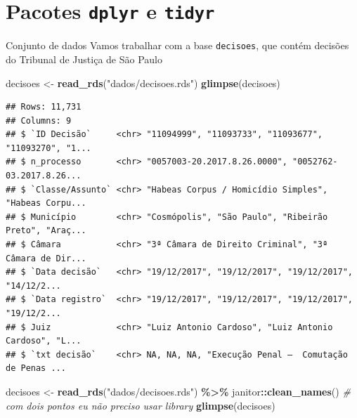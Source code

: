 \documentclass[
  10pt,
  ignorenonframetext,
]{beamer}
\newenvironment{Shaded}{\begin{snugshade}}{\end{snugshade}}
\newcommand{\CommentTok}[1]{\textcolor[rgb]{0.56,0.35,0.01}{\textit{#1}}}
\newcommand{\KeywordTok}[1]{\textcolor[rgb]{0.13,0.29,0.53}{\textbf{#1}}}
\newcommand{\NormalTok}[1]{#1}
\newcommand{\OperatorTok}[1]{\textcolor[rgb]{0.81,0.36,0.00}{\textbf{#1}}}
\newcommand{\StringTok}[1]{\textcolor[rgb]{0.31,0.60,0.02}{#1}}
\begin{document}
\hypertarget{pacotes-dplyr-e-tidyr}{%
\section{\texorpdfstring{Pacotes \texttt{dplyr} e
\texttt{tidyr}}{Pacotes dplyr e tidyr}}\label{pacotes-dplyr-e-tidyr}}

\begin{frame}[fragile]{Conjunto de dados}
\protect\hypertarget{conjunto-de-dados}{}
Vamos trabalhar com a base \texttt{decisoes}, que contém decisões do
Tribunal de Justiça de São Paulo

\begin{Shaded}
\begin{Highlighting}[]
\NormalTok{decisoes \textless{}{-}}\StringTok{ }\KeywordTok{read\_rds}\NormalTok{(}\StringTok{"dados/decisoes.rds"}\NormalTok{)}
\KeywordTok{glimpse}\NormalTok{(decisoes)}
\end{Highlighting}
\end{Shaded}

\begin{verbatim}
## Rows: 11,731
## Columns: 9
## $ `ID Decisão`     <chr> "11094999", "11093733", "11093677", "11093270", "1...
## $ n_processo       <chr> "0057003-20.2017.8.26.0000", "0052762-03.2017.8.26...
## $ `Classe/Assunto` <chr> "Habeas Corpus / Homicídio Simples", "Habeas Corpu...
## $ Município        <chr> "Cosmópolis", "São Paulo", "Ribeirão Preto", "Araç...
## $ Câmara           <chr> "3ª Câmara de Direito Criminal", "3ª Câmara de Dir...
## $ `Data decisão`   <chr> "19/12/2017", "19/12/2017", "19/12/2017", "14/12/2...
## $ `Data registro`  <chr> "19/12/2017", "19/12/2017", "19/12/2017", "19/12/2...
## $ Juiz             <chr> "Luiz Antonio Cardoso", "Luiz Antonio Cardoso", "L...
## $ `txt decisão`    <chr> NA, NA, NA, "Execução Penal –  Comutação de Penas ...
\end{verbatim}

\begin{Shaded}
\begin{Highlighting}[]
\NormalTok{decisoes \textless{}{-}}\StringTok{ }\KeywordTok{read\_rds}\NormalTok{(}\StringTok{"dados/decisoes.rds"}\NormalTok{) }\OperatorTok{\%\textgreater{}\%}
\StringTok{  }\NormalTok{janitor}\OperatorTok{::}\KeywordTok{clean\_names}\NormalTok{() }\CommentTok{\# com dois pontos eu não preciso usar library}
\KeywordTok{glimpse}\NormalTok{(decisoes)}
\end{Highlighting}
\end{Shaded}


\end{frame}
\end{document}
